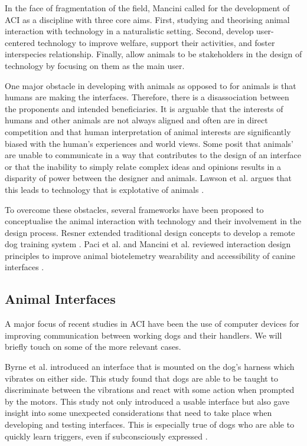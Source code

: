 \documentclass{sigchi}
\begin{document}
        In the face of fragmentation of the field, Mancini called for the development of ACI as a discipline with three core aims. First, studying and theorising animal interaction with technology in a naturalistic setting. Second, develop user-centered technology to improve welfare, support their activities, and foster interspecies relationship. Finally, allow animals to be stakeholders in the design of technology by focusing on them as the main user.
        
        One major obstacle in developing with animals as opposed to for animals is that humans are making the interfaces. Therefore, there is a disassociation between the proponents and intended beneficiaries. It is arguable that the interests of humans and other animals are not always aligned and often are in direct competition and that human interpretation of animal interests are significantly biased with the human’s experiences and world views. Some posit that animals’ are unable to communicate in a way that contributes to the design of an interface or that the inability to simply relate complex ideas and opinions results in a disparity of power between the designer and animals. Lawson et al. argues that this leads to technology that is explotative of animals \cite{Lawson:2015:PUT:2702123.2702260}.
        
        To overcome these obstacles, several frameworks have been proposed to conceptualise the animal interaction with technology and their involvement in the design process. Resner extended traditional design concepts to develop a remote dog training system \cite{Resner2001}. Paci et al. and Mancini et al. reviewed interaction design principles to improve animal biotelemetry wearability and accessibility of canine interfaces \cite{Paci2016, Mancini:2011:AIM:1978822.1978836}.

    \subsection{Animal Interfaces}
        A major focus of recent studies in ACI have been the use of computer devices for improving communication between working dogs and their handlers. We will briefly touch on some of the more relevant cases.
        
        Byrne et al. introduced an interface that is mounted on the dog’s harness which vibrates on either side. This study found that dogs are able to be taught to discriminate between the vibrations and react with some action when prompted by the motors. This study not only introduced a usable interface but also gave insight into some unexpected considerations that need to take place when developing and testing interfaces. This is especially true of dogs who are able to quickly learn triggers, even if subconsciously expressed \cite{Byrne2014}.
        
\end{document}
